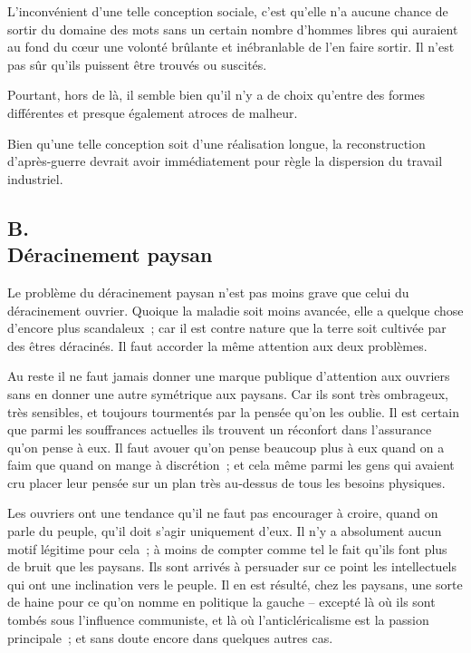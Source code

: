 \documentclass[french,twoside]{book} %
\begin{document}
L'inconvénient d'une telle conception sociale, c'est qu'elle n'a aucune chance de sortir du domaine des mots sans un certain nombre d'hommes libres qui auraient au fond du cœur une volonté brûlante et inébranlable de l'en faire sortir. Il n'est pas sûr qu'ils puissent être trouvés ou suscités.\par
Pourtant, hors de là, il semble bien qu'il n'y a de choix qu'entre des formes différentes et presque également atroces de malheur.\par
Bien qu'une telle conception soit d'une réalisation longue, la reconstruction d'après-guerre devrait avoir immédiatement pour règle la dispersion du travail industriel.
\subsection[B. Déracinement paysan]{B. \\
Déracinement paysan}
\noindent \par
Le problème du déracinement paysan n'est pas moins grave que celui du déracinement ouvrier. Quoique la maladie soit moins avancée, elle a quelque chose d'encore plus scandaleux ; car il est contre nature que la terre soit cultivée par des êtres déracinés. Il faut accorder la même attention aux deux problèmes.\par
Au reste il ne faut jamais donner une marque publique d'attention aux ouvriers sans en donner une autre symétrique aux paysans. Car ils sont très ombrageux, très sensibles, et toujours tourmentés par la pensée qu'on les oublie. Il est certain que parmi les souffrances actuelles ils trouvent un réconfort dans l'assurance qu'on pense à eux. Il faut avouer qu'on pense beaucoup plus à eux quand on a faim que quand on mange à discrétion ; et cela même parmi les gens qui avaient cru placer leur pensée sur un plan très au-dessus de tous les besoins physiques.\par
Les ouvriers ont une tendance qu'il ne faut pas encourager à croire, quand on parle du peuple, qu'il doit s'agir uniquement d'eux. Il n'y a absolument aucun motif légitime pour cela ; à moins de compter comme tel le fait qu'ils font plus de bruit que les paysans. Ils sont arrivés à persuader sur ce point les intellectuels qui ont une inclination vers le peuple. Il en est résulté, chez les paysans, une sorte de haine pour ce qu'on nomme en politique la gauche – excepté là où ils sont tombés sous l'influence communiste, et là où l'anticléricalisme est la passion principale ; et sans doute encore dans quelques autres cas.\par
\end{document}
